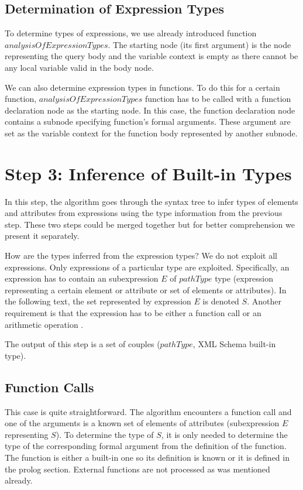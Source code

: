\subsection{Determination of Expression Types}
To determine types of expressions, we use already introduced function $analysisOfExpressionTypes$. The starting node (its first argument) is the node representing the query body and the variable context is empty as there cannot be any local variable valid in the body node.

We can also determine expression types in functions. To do this for a certain function, $analysisOfExpressionTypes$ function has to be called with a function declaration node as the starting node. In this case, the function declaration node contains a subnode specifying function's formal arguments. These argument are set as the variable context for the function body represented by another subnode.

\section{Step 3: Inference of Built-in Types}
In this step, the algorithm goes through the syntax tree to infer types of elements and attributes from expressions using the type information from the previous step. These two steps could be merged together but for better comprehension we present it separately.

How are the types inferred from the expression types? We do not exploit all expressions. Only expressions of a particular type are exploited. Specifically, an expression has to contain an subexpression $E$ of $pathType$ type (expression representing a certain element or attribute or set of elements or attributes). In the following text, the set represented by expression $E$ is denoted $S$. Another requirement is that the expression has to be either a function call or an arithmetic operation .

The output of this step is a set of couples ($pathType$, XML Schema built-in type).


\subsection{Function Calls}
This case is quite straightforward. The algorithm encounters a function call and one of the arguments is a known set of elements of attributes (subexpression $E$ representing $S$). To determine the type of $S$, it is only needed to determine the type of the corresponding formal argument from the definition of the function. The function is either a built-in one so its definition is known or it is defined in the prolog section. External functions are not processed as was mentioned already.

